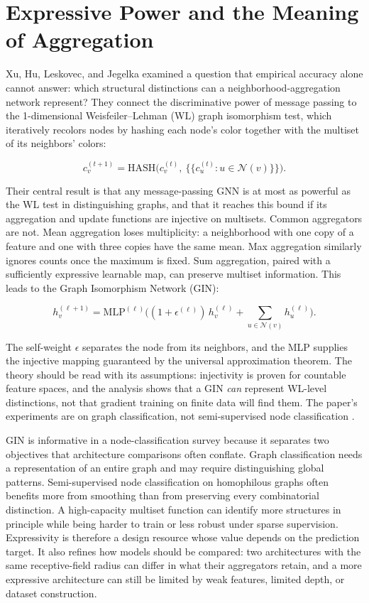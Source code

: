 \documentclass[conference]{IEEEtran}
\begin{document}
\section{Expressive Power and the Meaning of Aggregation}

Xu, Hu, Leskovec, and Jegelka \cite{b4} examined a question that empirical accuracy alone cannot answer: which structural distinctions can a neighborhood-aggregation network represent? They connect the discriminative power of message passing to the 1-dimensional Weisfeiler--Lehman (WL) graph isomorphism test, which iteratively recolors nodes by hashing each node's color together with the multiset of its neighbors' colors:

\[c_v^{(t+1)} = \mathrm{HASH}\Big(c_v^{(t)},\ \{\!\{c_u^{(t)} : u\in\mathcal{N}(v)\}\!\}\Big). \tag{8}\]

Their central result is that any message-passing GNN is at most as powerful as the WL test in distinguishing graphs, and that it reaches this bound if its aggregation and update functions are injective on multisets. Common aggregators are not. Mean aggregation loses multiplicity: a neighborhood with one copy of a feature and one with three copies have the same mean. Max aggregation similarly ignores counts once the maximum is fixed. Sum aggregation, paired with a sufficiently expressive learnable map, can preserve multiset information. This leads to the Graph Isomorphism Network (GIN):

\[h_v^{(\ell+1)} = \mathrm{MLP}^{(\ell)}\Big((1+\epsilon^{(\ell)})\,h_v^{(\ell)} + \sum_{u\in\mathcal{N}(v)} h_u^{(\ell)}\Big). \tag{9}\]

The self-weight \(\epsilon\) separates the node from its neighbors, and the MLP supplies the injective mapping guaranteed by the universal approximation theorem. The theory should be read with its assumptions: injectivity is proven for countable feature spaces, and the analysis shows that a GIN \emph{can} represent WL-level distinctions, not that gradient training on finite data will find them. The paper's experiments are on graph classification, not semi-supervised node classification \cite{b4}.

GIN is informative in a node-classification survey because it separates two objectives that architecture comparisons often conflate. Graph classification needs a representation of an entire graph and may require distinguishing global patterns. Semi-supervised node classification on homophilous graphs often benefits more from smoothing than from preserving every combinatorial distinction. A high-capacity multiset function can identify more structures in principle while being harder to train or less robust under sparse supervision. Expressivity is therefore a design resource whose value depends on the prediction target. It also refines how models should be compared: two architectures with the same receptive-field radius can differ in what their aggregators retain, and a more expressive architecture can still be limited by weak features, limited depth, or dataset construction.
\end{document}
